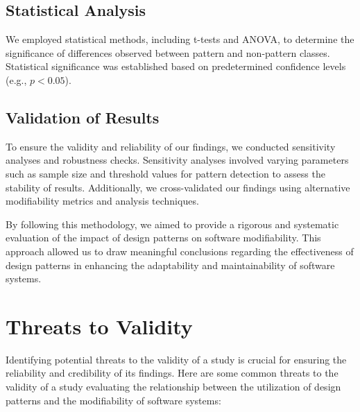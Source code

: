 \documentclass[conference]{IEEEtran}
\begin{document}
	\subsection{Statistical Analysis}
	We employed statistical methods, including t-tests and ANOVA, to determine the significance of differences observed between pattern and non-pattern classes. Statistical significance was established based on predetermined confidence levels (e.g., $p < 0.05$).
	
	\subsection{Validation of Results}
	To ensure the validity and reliability of our findings, we conducted sensitivity analyses and robustness checks. Sensitivity analyses involved varying parameters such as sample size and threshold values for pattern detection to assess the stability of results. Additionally, we cross-validated our findings using alternative modifiability metrics and analysis techniques.
	
	By following this methodology, we aimed to provide a rigorous and systematic evaluation of the impact of design patterns on software modifiability. This approach allowed us to draw meaningful conclusions regarding the effectiveness of design patterns in enhancing the adaptability and maintainability of software systems.

	
	\section{Threats to Validity}
	
	Identifying potential threats to the validity of a study is crucial for ensuring the reliability and credibility of its findings. Here are some common threats to the validity of a study evaluating the relationship between the utilization of design patterns and the modifiability of software systems:
	
\end{document}

